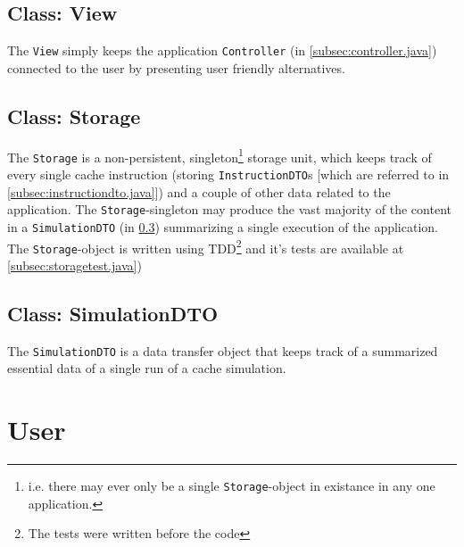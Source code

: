 \documentclass[a4paper]{scrreprt}
\begin{document}


\subsection{Class: View}
\label{subsec:view.java}

The \texttt{View} simply keeps the application \texttt{Controller} (in \ref{subsec:controller.java}) connected to the user by presenting user friendly alternatives.



\subsection{Class: Storage}
\label{subsec:storage.java}

The \texttt{Storage} is a non-persistent, singleton\footnote{i.e. there may ever only be a single \texttt{Storage}-object in existance in any one application.} storage unit, which keeps track of every single cache instruction (storing \texttt{InstructionDTO}s [which are referred to in \ref{subsec:instructiondto.java}]) and a couple of other data related to the application. The \texttt{Storage}-singleton may produce the vast majority of the content in a \texttt{SimulationDTO} (in \ref{subsec:simulationdto.java}) summarizing a single execution of the application. The \texttt{Storage}-object is written using TDD\footnote{The tests were written before the code} and it's tests are available at \ref{subsec:storagetest.java})



\subsection{Class: SimulationDTO}
\label{subsec:simulationdto.java}

The \texttt{SimulationDTO} is a data transfer object that keeps track of a summarized essential data of a single run of a cache simulation.



\section{User}
\label{sec:user}
\end{document}
